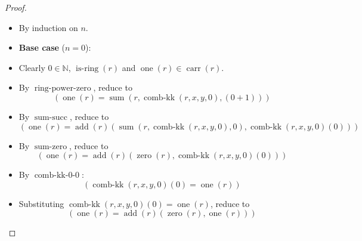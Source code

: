 \documentclass[11pt]{article}
\theoremstyle{plain}
\begin{document}
\begin{proof}
\begin{itemize}[leftmargin=2.8em, itemsep=4pt, parsep=1pt]
  \item[\textbf{1}] By induction on $n$.
  \item[]\textbf{Base case} ($n = 0$):
  \item[\textbf{2--7}] Clearly $0 \in \mathbb{N}$, $\operatorname{is\text{-}ring}(r)$ and $\operatorname{one}(r) \in \operatorname{carr}(r)$.
  \item[\textbf{8}] By $\operatorname{ring\text{-}power\text{-}zero}$, reduce to
\begin{equation*}
(\operatorname{one}(r) = \operatorname{sum}(r, \operatorname{comb\text{-}kk}(r, x, y, 0), (0 + 1)))
\end{equation*}

  \item[\textbf{9}] By $\operatorname{sum\text{-}succ}$, reduce to
\begin{equation*}
(\operatorname{one}(r) = \operatorname{add}(r)(\operatorname{sum}(r, \operatorname{comb\text{-}kk}(r, x, y, 0), 0), \operatorname{comb\text{-}kk}(r, x, y, 0)(0)))
\end{equation*}

  \item[\textbf{10}] By $\operatorname{sum\text{-}zero}$, reduce to
\begin{equation*}
(\operatorname{one}(r) = \operatorname{add}(r)(\operatorname{zero}(r), \operatorname{comb\text{-}kk}(r, x, y, 0)(0)))
\end{equation*}

  \item[\textbf{11}] By $\operatorname{comb\text{-}kk\text{-}0\text{-}0}$:
\begin{equation*}
(\operatorname{comb\text{-}kk}(r, x, y, 0)(0) = \operatorname{one}(r))
\end{equation*}

  \item[\textbf{12}] Substituting $\operatorname{comb\text{-}kk}(r, x, y, 0)(0) = \operatorname{one}(r)$, reduce to
\begin{equation*}
(\operatorname{one}(r) = \operatorname{add}(r)(\operatorname{zero}(r), \operatorname{one}(r)))
\end{equation*}


\end{itemize}
\end{proof}
\end{document}
